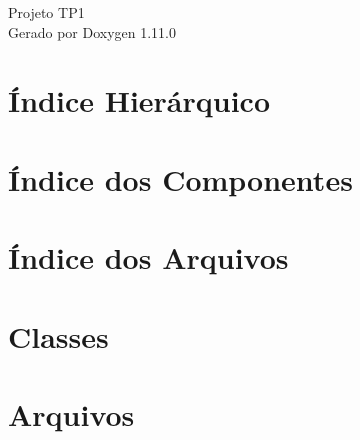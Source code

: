 \documentclass[twoside]{book}
\newcommand{\+}{\discretionary{\mbox{\scriptsize$\hookleftarrow$}}{}{}}
\newcommand{\clearemptydoublepage}{%
    \newpage{\pagestyle{empty}\cleardoublepage}%
  }
\begin{document}
  \raggedbottom
    \hypersetup{pageanchor=false,
                bookmarksnumbered=true,
                pdfencoding=unicode
               }
  \begin{titlepage}
  \vspace*{7cm}
  \begin{center}%
  {\Large Projeto TP1}\\
  \vspace*{1cm}
  {\large Gerado por Doxygen 1.11.0}\\
  \end{center}
  \end{titlepage}
  \clearemptydoublepage
  \tableofcontents
  \clearemptydoublepage
  \hypersetup{pageanchor=true}

\chapter{Índice Hierárquico}

\chapter{Índice dos Componentes}

\chapter{Índice dos Arquivos}

\chapter{Classes}






























\chapter{Arquivos}






  \backmatter
  \newpage
  \clearemptydoublepage
  \printindex
\end{document}
